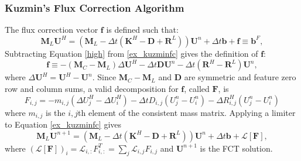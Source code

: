 \subsubsection{Kuzmin's Flux Correction Algorithm}
The flux correction vector $\mathbf{f}$ is defined such that:
\begin{equation}\label{ex_kuzminfc}
   \mathbf{M}_L\mathbf{U}^H
      = (\mathbf{M}_L - \Delta t(\mathbf{K}^H - \mathbf{D} + \mathbf{R}^L))\mathbf{U}^n
         + \Delta t\mathbf{b} + \mathbf{f} \equiv \mathbf{b}^F,
\end{equation}
Subtracting Equation \ref{high} from \ref{ex_kuzminfc} gives the definition of
$\mathbf{f}$:
\begin{equation}\label{ex_kuzminFdef}
   \mathbf{f} \equiv -(\mathbf{M}_C-\mathbf{M}_L)\Delta\mathbf{U}^H
      -\Delta t\mathbf{D}\mathbf{U}^n - \Delta t(\mathbf{R}^H-\mathbf{R}^L)\mathbf{U}^n,
\end{equation}
where $\Delta\mathbf{U}^H = \mathbf{U}^H - \mathbf{U}^n$. Since
$\mathbf{M}_C-\mathbf{M}_L$ and $\mathbf{D}$ are symmetric
and feature zero row and column sums, a valid decomposition for $\mathbf{f}$,
called $\mathbf{F}$, is
\begin{equation}
   F_{i,j} = -m_{i,j}(\Delta U^H_j - \Delta U^H_i) - \Delta t D_{i,j}(U^n_j - U^n_i)
   - \Delta R_{i,j}^H(U^n_j - U^n_i)
\end{equation}
where $m_{i,j}$ is the $i,j$th element of the consistent mass matrix.
Applying a limiter to Equation \ref{ex_kuzminfc} gives
\begin{equation}\label{ex_limited}
   \mathbf{M}_L\mathbf{U}^{n+1}
      = (\mathbf{M}_L - \Delta t(\mathbf{K}^H - \mathbf{D} + \mathbf{R}^L))\mathbf{U}^n
         + \Delta t\mathbf{b} + \mathcal{L}[\mathbf{F}],
\end{equation}
where $(\mathcal{L}[\mathbf{F}])_i = \mathcal{L}_{i,:}F_{i,:}^T
= \sum\limits_j \mathcal{L}_{i,j}F_{i,j}$ and $\mathbf{U}^{n+1}$ is the FCT solution.

